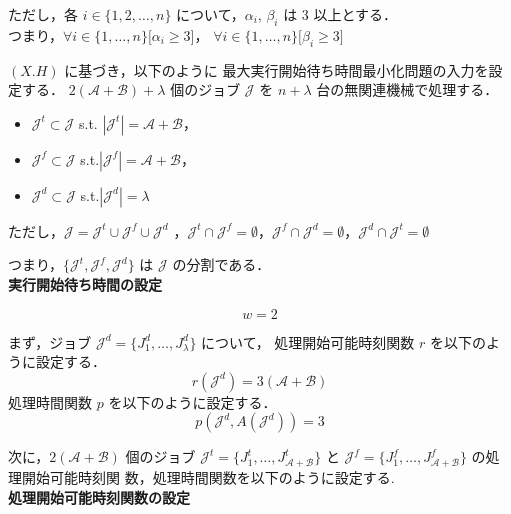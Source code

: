 \documentclass[12pt]{optlab-bachelor}
\begin{document}
ただし，各 $i \in \{1,2,\ldots, n\}$ について，$\alpha_i$, $\beta_i$ は 3 以上とする．\\
つまり，$\forall i \in \{1,\ldots,n\}\big[\alpha_i \ge 3\big]$，
$\forall i \in \{1,\ldots,n\}\big[\beta_i \ge 3\big]$

$(X.H)$ に基づき，以下のように 最大実行開始待ち時間最小化問題の入力を設定する．
$2(\mathcal{A} + \mathcal{B}) + \lambda$ 個のジョブ $\mathcal{J}$ を
$n + \lambda$ 台の無関連機械で処理する．
\begin{itemize}
\item $\mathcal{J}^t \subset \mathcal{J}$ s.t. $|\mathcal{J}^t| =
  \mathcal{A}  + \mathcal{B}$，
\item $\mathcal{J}^f \subset \mathcal{J}$
  s.t.$|\mathcal{J}^f| = \mathcal{A}  + \mathcal{B}$，
\item $\mathcal{J}^d \subset \mathcal{J}$ s.t.$|\mathcal{J}^d| =
  \lambda$
\end{itemize}
ただし，$\mathcal{J} = \mathcal{J}^t \cup \mathcal{J}^f \cup
\mathcal{J}^d$ ，$\mathcal{J}^t \cap \mathcal{J}^f = \emptyset$，$\mathcal{J}^f \cap \mathcal{J}^d = \emptyset$，$\mathcal{J}^d \cap \mathcal{J}^t = \emptyset$

つまり，$\{\mathcal{J}^t, \mathcal{J}^f,\mathcal{J}^d\}$ は $\mathcal{J}$ の分割である．\\

\noindent \textbf{実行開始待ち時間の設定}

$$w = 2$$

まず，ジョブ $\mathcal{J}^d = \{J^d_1,\ldots,J^d_{\lambda}\}$ について，
処理開始可能時刻関数 $r$ を以下のように設定する．
$$r(\mathcal{J}^d) = 3(\mathcal{A} + \mathcal{B})$$
処理時間関数 $p$ を以下のように設定する．
$$p(\mathcal{J}^d, A(\mathcal{J}^d)) = 3$$

次に，$2(\mathcal{A} + \mathcal{B})$ 個のジョブ $\mathcal{J}^t =
\{J^t_1,\ldots,J^t_{\mathcal{A} + \mathcal{B}}\}$ と $\mathcal{J}^f =
\{J^f_1,\ldots,J^f_{\mathcal{A} + \mathcal{B}}\}$ の処理開始可能時刻関
数，処理時間関数を以下のように設定する.\\

\noindent \textbf{処理開始可能時刻関数の設定}
\end{document}
